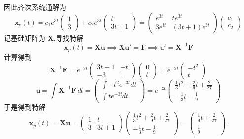 \begin{questions}
\begin{solution}
\[        \]
        因此齐次系统通解为
        \[
        \boldsymbol{x}_c(t) = c_1 e^{3t} \begin{pmatrix} 1 \\ 3 \end{pmatrix} + c_2 e^{3t} \begin{pmatrix} t \\ 3t+1 \end{pmatrix} = \begin{pmatrix} e^{3t} & t e^{3t} \\ 3 e^{3t} & (3t+1)e^{3t} \end{pmatrix} \begin{pmatrix} c_1 \\ c_2 \end{pmatrix}
        \]
        记基础矩阵为 $\boldsymbol{X}$,寻找特解
        \[
        \boldsymbol{x}_p(t) = \boldsymbol{X} \boldsymbol{u} \implies \boldsymbol{X} \boldsymbol{u}' = \boldsymbol{F} \implies \boldsymbol{u}' = \boldsymbol{X}^{-1} \boldsymbol{F}
        \]
        计算得到
        \[
        \boldsymbol{X}^{-1}\boldsymbol{F} = e^{-3t} \begin{pmatrix} 3t+1 & -t \\ -3 & 1 \end{pmatrix} \begin{pmatrix} 0 \\ t \end{pmatrix} = e^{-3t} \begin{pmatrix} -t^2 \\ t \end{pmatrix}
        \]
        \[
        \boldsymbol{u} = \int \boldsymbol{X}^{-1} \boldsymbol{F}\, dt = \begin{pmatrix} \int -t^2 e^{-3t} dt \\ \int t e^{-3t} dt \end{pmatrix} = e^{-3t} \begin{pmatrix} \frac{1}{3} t^2 + \frac{2}{9} t + \frac{2}{27} \\ -\frac{1}{3} t - \frac{1}{9} \end{pmatrix}
        \]
        于是得到特解
        \[
        \boldsymbol{x}_p(t) = \boldsymbol{X}\boldsymbol{u} = \begin{pmatrix} 1 & t \\ 3 & 3t+1 \end{pmatrix} \begin{pmatrix} \frac{1}{3} t^2 + \frac{2}{9} t + \frac{2}{27} \\ -\frac{1}{3} t - \frac{1}{9} \end{pmatrix} = \begin{pmatrix} \frac{1}{9} t + \frac{2}{27} \\ \frac{1}{9} \end{pmatrix}.
\]
\end{solution}
\end{questions}
